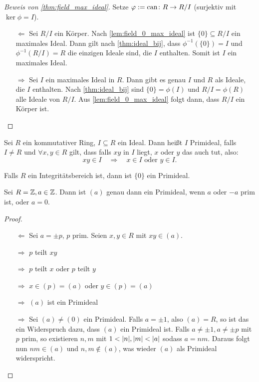 \documentclass[12pt,a4paper]{scrartcl}
\begin{document}
\begin{proof}[Beweis von \cref{thm:field_max_ideal}] %
	Setze $\varphi := \operatorname{can} \colon R\to R/I$ (surjektiv mit $\ker\phi = I$).
	\begin{itemize}
		\item [\glqq $\Leftarrow$\grqq ] Sei $R/I$ ein Körper. Nach \cref{lem:field_0_max_ideal} ist $\{0\}\subseteq R/I$ ein maximales Ideal. Dann gilt nach \cref{thm:ideal_bij}, dass $\phi^{-1}(\{0\}) = I$ und $\phi^{-1}(R/I) = R$ die einzigen Ideale sind, die $I$ enthalten. Somit ist $I$ ein maximales Ideal.
		\item[\glqq$\Rightarrow$\grqq] Sei $I$ ein maximales Ideal in $R$. Dann gibt es genau $I$ und $R$ als Ideale, die $I$ enthalten.
		Nach \cref{thm:ideal_bij} sind $\{0\} = \phi(I)$ und $R/I = \phi(R)$ alle Ideale von $R/I$. Aus \cref{lem:field_0_max_ideal} folgt dann, dass $R/I$ ein Körper ist.
	\end{itemize}
\end{proof}

\begin{defi}
	Sei $R$ ein kommutativer Ring, $I\subseteq R$ ein Ideal. Dann heißt $I$ Primideal, falls $I\neq R$ und $\forall x, y\in R$ gilt, dass falls $xy$ in $I$ liegt, $x$ oder $y$ das auch tut, also: \[xy\in I \quad \Longrightarrow \quad x\in I\text{ oder }y\in I.\]
\end{defi}
\begin{bem}
	Falls $R$ ein Integritätsbereich ist, dann ist $\{0\}$ ein Primideal.
\end{bem}

\begin{bsp}
	Sei $R = \mathbb Z, a\in \mathbb Z$. Dann ist $(a)$ genau dann ein Primideal, wenn $a$ oder $-a$ prim ist, oder $a = 0$.
\end{bsp}
\begin{proof}
	\leavevmode
	\begin{itemize}
		\item [\glqq $\Leftarrow$\grqq ]Sei $a = \pm p$, $p$ prim. Seien $x,y\in R$ mit $xy\in (a)$.

		$\Rightarrow$ $p$ teilt $xy$

		$\Rightarrow$ $p$ teilt $x$ oder $p$ teilt $y$

		$\Rightarrow$ $x\in (p) = (a)$ oder $y\in (p) = (a)$

		$\Rightarrow$ $(a)$ ist ein Primideal
		\item [\glqq $\Rightarrow$\grqq ] Sei $(a) \neq (0)$ ein Primideal. Falls $a = \pm 1$, also $ (a) = R$, so ist das ein Widerspruch dazu, dass $(a)$ ein Primideal ist. Falls $a \neq \pm 1, a\neq \pm p$ mit $p$ prim, so existieren $n, m$ mit $1<\lvert n\rvert, \lvert m\rvert<\lvert a\rvert$ sodass $a = nm$. 
		Daraus folgt nun $ nm\in (a)$ und $n,m\notin (a)$, was wieder $(a)$ als Primideal widerspricht.
	\end{itemize}
\end{proof}
\end{document}
